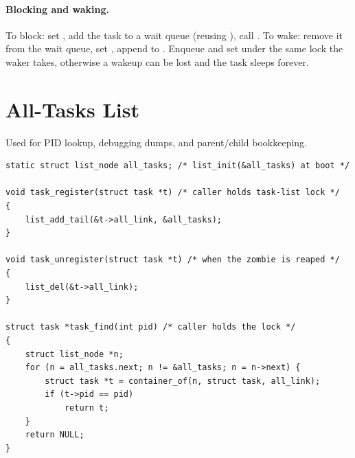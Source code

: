 \paragraph{Blocking and waking.} To block: set ,
add the task to a wait queue (reusing ), call .
To wake: remove it from the wait queue, set , append to
. Enqueue and set  under the same lock the waker
takes, otherwise a wakeup can be lost and the task sleeps forever.

\section{All-Tasks List}
Used for PID lookup, debugging dumps, and parent/child bookkeeping.

\begin{lstlisting}[style=cstyle]
static struct list_node all_tasks; /* list_init(&all_tasks) at boot */

void task_register(struct task *t) /* caller holds task-list lock */
{
    list_add_tail(&t->all_link, &all_tasks);
}

void task_unregister(struct task *t) /* when the zombie is reaped */
{
    list_del(&t->all_link);
}

struct task *task_find(int pid) /* caller holds the lock */
{
    struct list_node *n;
    for (n = all_tasks.next; n != &all_tasks; n = n->next) {
        struct task *t = container_of(n, struct task, all_link);
        if (t->pid == pid)
            return t;
    }
    return NULL;
}
\end{lstlisting}

